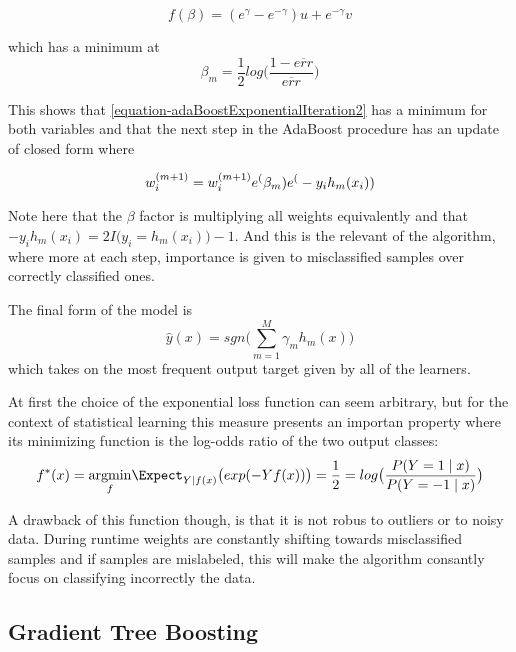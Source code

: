  \begin{equation} \label{equation-adaBoostBetaMinimization}
f(\beta) = ( e^{\gamma} - e^{-\gamma}) u +  e^{-\gamma}v
\end{equation}

which has a minimum at 
\begin{equation}
\beta_{m} = \frac{1}{2} log\big( \frac{1 - \overline{err} }{ \overline{err} }  \big)
\end{equation}

This shows that \ref{equation-adaBoostExponentialIteration2} has a minimum for both variables and that the next step in the AdaBoost procedure has an update of closed form where

\begin{equation}
 w_i^{(m+1)} =   w_i^{(m+1)} e^(\beta_m) e^(-y_i h_m(x_i)) \\
 \end{equation} 
 
Note here that the $\beta$ factor is multiplying all weights equivalently and that $-y_i h_m(x_i) = 2I \big( y_i = h_m(x_i)   \big) -1$. And this is the relevant of the algorithm, where more at each step, importance is given to misclassified samples over correctly classified ones. 

The final form of the model is
$$  \hat{y}(x) = sgn\big(  \sum_{m=1}^{M} \gamma_m h_m(x) \big)$$ which takes on the most frequent output target given by all of the learners.

At first the choice of the exponential loss function can seem arbitrary, but for the context of statistical learning this measure presents an importan property where its minimizing function is the log-odds ratio of the two output classes:
$$f^*(x) = \underset{f}{\mathrm{argmin}} \Expect_{Y | f(x)}\big( exp(-Yf(x))  \big) = \frac{1}{2} =
log\big( \frac{ P(Y=1 \mid x) }{ P(Y=-1 \mid x) }  \big) $$

 A drawback of this function though, is that it is not robus to outliers or to noisy data. During runtime weights are constantly shifting towards misclassified samples and if samples are mislabeled, this will make the algorithm consantly focus on classifying incorrectly the data. 









\subsection{Gradient Tree Boosting}

